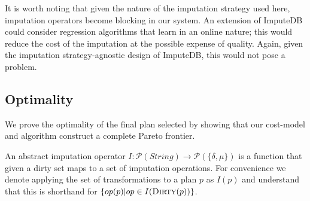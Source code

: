 It is worth noting that given the nature of the imputation strategy used here, imputation
operators become blocking in our system. An extension of ImputeDB could consider regression
algorithms that learn in an online nature; this would reduce the cost of the imputation at
the possible expense of quality. Again, given the imputation strategy-agnostic design of
ImputeDB, this would not pose a problem.

%    

\subsection{Optimality}
We prove the optimality of the final plan selected by showing that our cost-model and algorithm
construct a complete Pareto frontier.

\begin{definition}
An abstract imputation operator $I: \mathcal{P}(String) \rightarrow \mathcal{P}(\{ \delta, \mu \})$ is a function that given a dirty set maps to
a set of imputation operations. For convenience we denote applying the set of transformations to a plan $p$ as $I(p)$ and understand that this
is shorthand for $\{ op(p)   | op \in I(\textsc{Dirty}(p)) \}$.
\end{definition}

